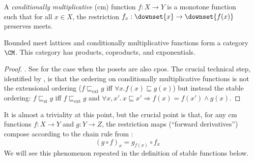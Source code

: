 \begin{definition}
  A \emph{conditionally multiplicative} (cm) function $f : X \to Y$ is
  a monotone function such that for all $x \in X$, the restriction
  $f_x : \downset{x} \to \downset{f(x)}$ preserves meets.
\end{definition}

\begin{theorem}
  Bounded meet lattices and conditionally multiplicative functions form
  a category $\CM$. This category has products, coproducts, and
  exponentials.
\end{theorem}

\begin{proof}
  \AGDA. See \citet[Theorem 12.1.9]{amadio-curien} for the
  case when the posets are also cpos. The crucial technical step,
  identified by \citet{berry79}, is that the ordering on conditionally
  multiplicative functions is not the extensional ordering
  ($f \sqsubseteq_{\mathrm{ext}} g$ iff
  $\forall x. f(x) \sqsubseteq g(x)$) but instead the stable ordering:
  $f \sqsubseteq_{\mathrm{st}} g$ iff $f \sqsubseteq_{\mathrm{ext}} g$ and
  $\forall x, x'.\,x \sqsubseteq x' \Rightarrow f(x) = f(x') \land
  g(x)$.
\end{proof}

\begin{remark}
  \label{rem:chain-rule-cm}
  It is almost a triviality at this point, but the crucial point is
  that, for any cm functions $f : X \to Y$ and $g : Y \to Z$, the
  restriction maps (``forward derivatives'') compose according to the
  chain rule from :
  \begin{displaymath}
    (g \circ f)_x = g_{f(x)} \circ f_x
  \end{displaymath}
  We will see this phenomenon repeated in the definition of stable
  functions below.
\end{remark}

